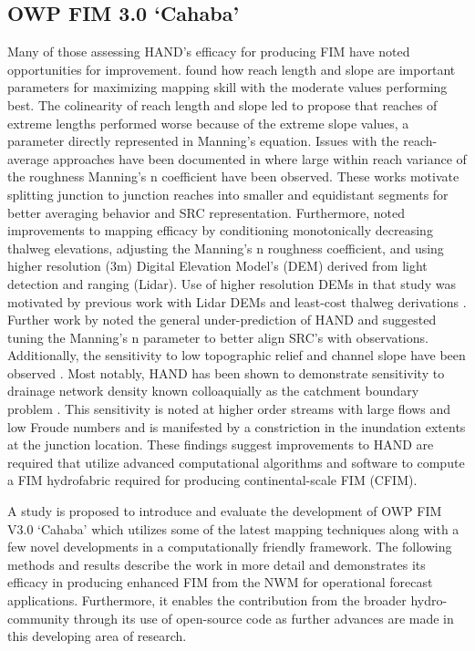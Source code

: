 \subsection{OWP FIM 3.0 `Cahaba'}
%
Many of those assessing HAND's efficacy for producing FIM have noted opportunities for improvement. 
 found how reach length and slope are important parameters for maximizing mapping skill with the moderate values performing best. 
The colinearity of reach length and slope led  to propose that reaches of extreme lengths performed worse because of the extreme slope values, a parameter directly represented in Manning's equation. 
Issues with the reach-average approaches have been documented in  where large within reach variance of the roughness Manning's n coefficient have been observed.
These works motivate splitting junction to junction reaches into smaller and equidistant segments for better averaging behavior and SRC representation. 
Furthermore,  noted improvements to mapping efficacy by conditioning monotonically decreasing thalweg elevations, adjusting the Manning's n roughness coefficient, and using higher resolution (3m) Digital Elevation Model's (DEM) derived from light detection and ranging (Lidar).
Use of higher resolution DEMs in that study was motivated by previous work with Lidar DEMs and least-cost thalweg derivations \cite{zheng2018geoflood}.
Further work by  noted the general under-prediction of HAND and suggested tuning the Manning's n parameter to better align SRC's with observations. 
Additionally, the sensitivity to low topographic relief and channel slope have been observed \cite{johnson2019integrated,godbout2019error}. 
Most notably, HAND has been shown to demonstrate sensitivity to drainage network density known colloaquially as the catchment boundary problem \cite{zhang2018comparative,mcgehee2016modified,li2020evaluation,nobre2016hand}.
This sensitivity is noted at higher order streams with large flows and low Froude numbers and is manifested by a constriction in the inundation extents at the junction location.
These findings suggest improvements to HAND are required that utilize advanced computational algorithms and software to compute a FIM hydrofabric required for producing continental-scale FIM (CFIM).

A study is proposed to introduce and evaluate the development of OWP FIM V3.0 `Cahaba' which utilizes some of the latest mapping techniques along with a few novel developments in a computationally friendly framework. 
The following methods and results describe the work in more detail and demonstrates its efficacy in producing enhanced FIM from the NWM for operational forecast applications. 
Furthermore, it enables the contribution from the broader hydro-community through its use of open-source code as further advances are made in this developing area of research.
%
